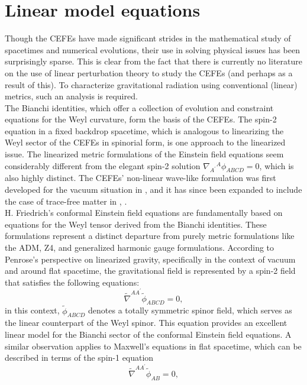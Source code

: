 \section{Linear model equations}
\label{sec:LinearModelEquations}
Though the CEFEs have made significant strides in the mathematical study of spacetimes and numerical evolutions, their use in solving physical issues has been surprisingly sparse. This is clear from the fact that there is currently no literature on the use of linear perturbation theory to study the CEFEs (and perhaps as a result of this). To characterize gravitational radiation using conventional (linear) metrics, such an analysis is required.\\
The Bianchi identities, which offer a collection of evolution and constraint equations for the Weyl curvature, form the basis of the CEFEs. The spin-2 equation in a fixed backdrop spacetime, which is analogous to linearizing the Weyl sector of the CEFEs in spinorial form, is one approach to the linearized issue. The linearized metric formulations of the Einstein field equations seem considerably different from the elegant spin-2 solution $\nabla_{A^{\prime}}{ }^A \phi_{A B C D}=0$, which is also highly distinct. The CEFEs' non-linear wave-like formulation was first developed for the vacuum situation in \cite{Pae14}, and it has since been expanded to include the case of trace-free matter in \cite{CarHurKro19}, \cite{FenGas23}.\\
H. Friedrich's conformal Einstein field equations are fundamentally based on equations for the Weyl tensor derived from the Bianchi identities. These formulations represent a distinct departure from purely metric formulations like the ADM, Z4, and generalized harmonic gauge formulations. According to Penrose's perspective on linearized gravity, specifically in the context of vacuum and around flat spacetime, the gravitational field is represented by a spin-2 field that satisfies the following equations:
\begin{equation}\label{eq:Spin2Eq}
  \tilde{\nabla}^{A A^{\prime}} \tilde{\phi}_{A B C D}=0,
\end{equation}
in this context, $\tilde{\phi}_{A B C D}$ denotes a totally symmetric spinor field, which serves as the linear counterpart of the Weyl spinor.
This equation provides an excellent linear model for the Bianchi sector of the conformal Einstein field equations. A similar observation applies to Maxwell's equations in flat spacetime, which can be described in terms of the spin-1 equation
\begin{equation}\label{eq:Spin1Eq}
  \tilde{\nabla}^{A A^{\prime}} \tilde{\phi}_{A B}=0,
\end{equation}
